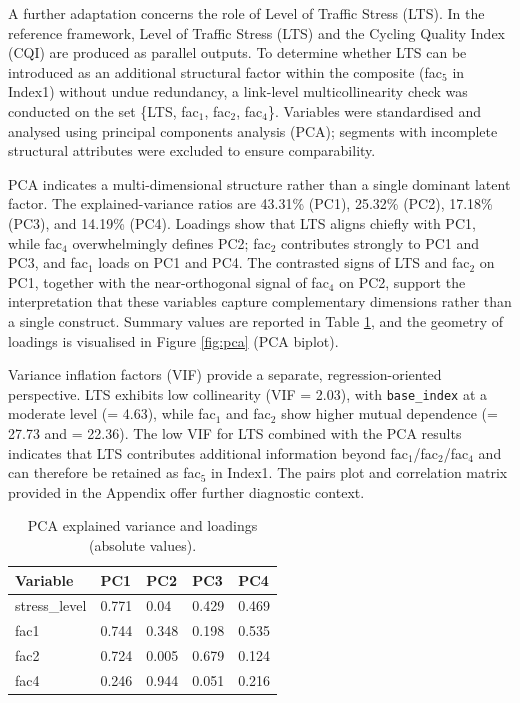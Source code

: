 \documentclass[
  12pt,
  oneside]{book}
\begin{document}
A further adaptation concerns the role of Level of Traffic Stress (LTS). In the reference framework, Level of Traffic Stress (LTS) and the Cycling Quality Index (CQI) are produced as parallel outputs. To determine whether LTS can be introduced as an additional structural factor within the composite (fac\(_5\) in Index1) without undue redundancy, a link-level multicollinearity check was conducted on the set \{LTS, fac\(_1\), fac\(_2\), fac\(_4\)\}. Variables were standardised and analysed using principal components analysis (PCA); segments with incomplete structural attributes were excluded to ensure comparability.

PCA indicates a multi-dimensional structure rather than a single dominant latent factor. The explained-variance ratios are 43.31\% (PC1), 25.32\% (PC2), 17.18\% (PC3), and 14.19\% (PC4). Loadings show that LTS aligns chiefly with PC1, while fac\(_4\) overwhelmingly defines PC2; fac\(_2\) contributes strongly to PC1 and PC3, and fac\(_1\) loads on PC1 and PC4. The contrasted signs of LTS and fac\(_2\) on PC1, together with the near-orthogonal signal of fac\(_4\) on PC2, support the interpretation that these variables capture complementary dimensions rather than a single construct. Summary values are reported in Table \ref{tab:PCA}, and the geometry of loadings is visualised in Figure \ref{fig:pca} (PCA biplot).

Variance inflation factors (VIF) provide a separate, regression-oriented perspective. LTS exhibits low collinearity (VIF = 2.03), with \texttt{base\_index} at a moderate level (= 4.63), while fac\(_1\) and fac\(_2\) show higher mutual dependence (= 27.73 and = 22.36). The low VIF for LTS combined with the PCA results indicates that LTS contributes additional information beyond fac\(_1\)/fac\(_2\)/fac\(_4\) and can therefore be retained as fac\(_5\) in Index1. The pairs plot and correlation matrix provided in the Appendix offer further diagnostic context.

\begin{table}[H]
\centering
\caption{\label{tab:PCA}PCA explained variance and loadings (absolute values).}
\centering
\begin{tabular}[t]{lllll}
\toprule
\textbf{Variable} & \textbf{PC1} & \textbf{PC2} & \textbf{PC3} & \textbf{PC4}\\
\midrule
stress\_level & 0.771 & 0.04 & 0.429 & 0.469\\
fac1 & 0.744 & 0.348 & 0.198 & 0.535\\
fac2 & 0.724 & 0.005 & 0.679 & 0.124\\
fac4 & 0.246 & 0.944 & 0.051 & 0.216\\
\bottomrule
\end{tabular}
\end{table}
\end{document}
